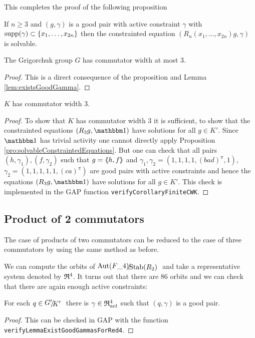 \documentclass[a4paper,12pt]{article}
\begin{document}
This completes the proof of the following proposition
\begin{pro}\label{pro:solvableConstraintedEquations}
 If $n\geq3$ and $(g,\gamma)$ is a good pair with active constraint $\gamma$ with $\textup{supp}(\gamma)\subset\{x_1,\ldots,x_{2n}\}$
 then the constrainted equation $(R_n(x_1,\ldots,x_{2n})g,\gamma)$ is solvable. 
\end{pro}
\begin{cor}
 The Grigorchuk group $G$ has commutator width at most $3$.
\end{cor}
\begin{proof}
 This is a direct consequence of the proposition and Lemma \ref{lem:existsGoodGamma}.
\end{proof}


\begin{cor}
 $K$ has commutator width $3$. 
\end{cor}
\begin{proof}
 To show that $K$ has commutator width $3$ it is sufficient, to show that the constrainted equations $(R_3g,\id)$ have solutions for all $g\in K'$. 
 Since $\id$ has trivial activity one cannot directly apply Proposition \ref{pro:solvableConstraintedEquations}.
 But one can check that all pairs $(h,\gamma_1),(f,\gamma_2)$
 such that $g=\langle\negthickspace\langle h,f\rangle\negthickspace\rangle$ and $\gamma_1,\gamma_2=(1,1,1,1,(bad)^\pi,1)$, $\gamma_2=(1,1,1,1,1,(ca)^\pi)$
 are good pairs with active constraints and hence the equations $(R_3g,\id)$ have solutions for all $g\in K'$. 
 This check is implemented in the GAP function \lstinline{verifyCorollaryFiniteCWK}. 
\end{proof}

\subsection{Product of 2 commutators}
The case of products of two commutators can be reduced to the case of three commutators by using the same method as before.

We can compute the orbits of $\RNK{\Aut(F\_4)}{\Stab(R_2)}$ and take a representative system denoted by $\mathfrak{R}^4$.
It turns out that there are $86$ orbits and we can check that there are again enough active constraints:
\begin{lem} \label{lem:existsGoodGammaForRed4}
 For each $q\in\RNK{G'}{K'}$ there is $\gamma\in \mathfrak{R}^4_{act}$ such that $(q,\gamma)$ is a 
 good pair.
\end{lem}
\begin{proof}
 This can be checked in GAP with the function \lstinline{verifyLemmaExistGoodGammasForRed4}.
\end{proof}
\end{document}
